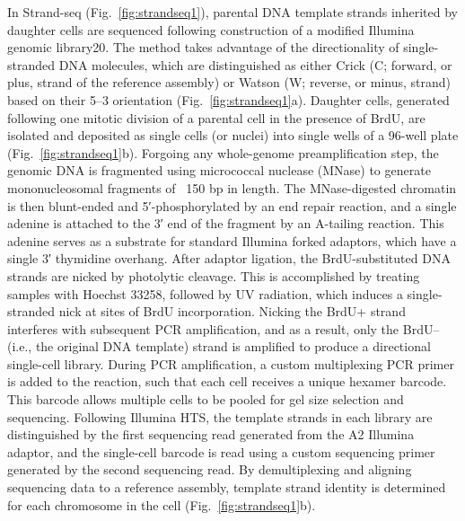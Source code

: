 In Strand-seq (Fig.~\ref{fig:strandseq1}), parental DNA template strands inherited by
daughter cells are sequenced following construction of a modified
Illumina genomic library20. The method takes advantage of the
directionality of single-stranded DNA molecules, which are distinguished
as either Crick (C; forward, or plus, strand of the reference
assembly) or Watson (W; reverse, or minus, strand) based 
on their 5\′–3\′ orientation (Fig.~\ref{fig:strandseq1}a). Daughter cells, generated following
one mitotic division of a parental cell in the presence of
BrdU, are isolated and deposited as single cells (or nuclei) into 
single wells of a 96-well plate (Fig.~\ref{fig:strandseq1}b). Forgoing any whole-genome
preamplification step, the genomic DNA is fragmented using
micrococcal nuclease (MNase) to generate mononucleosomal
fragments of ~150 bp in length. The MNase-digested chromatin
is then blunt-ended and 5′-phosphorylated by an end repair reaction,
and a single adenine is attached to the 3′ end of the fragment
by an A-tailing reaction. This adenine serves as a substrate for
standard Illumina forked adaptors, which have a single 3′ thymidine
overhang. After adaptor ligation,
the BrdU-substituted DNA strands are nicked by photolytic cleavage.
This is accomplished by treating samples with Hoechst 33258,
followed by UV radiation, which induces a single-stranded nick
at sites of BrdU incorporation. Nicking the BrdU+ strand
interferes with subsequent PCR amplification, and as a result, only
the BrdU– (i.e., the original DNA template) strand is amplified to
produce a directional single-cell library.
During PCR amplification, a custom multiplexing PCR primer
is added to the reaction, such that each
cell receives a unique hexamer barcode. This barcode allows
multiple cells to be pooled for gel size selection and sequencing.
Following Illumina HTS, the template strands in each library are
distinguished by the first sequencing read generated from the
A2 Illumina adaptor, and the single-cell barcode is read using a
custom sequencing primer generated by the second sequencing
read. By demultiplexing and aligning sequencing data to a reference
assembly, template strand identity is determined for each
chromosome in the cell (Fig.~\ref{fig:strandseq1}b).

